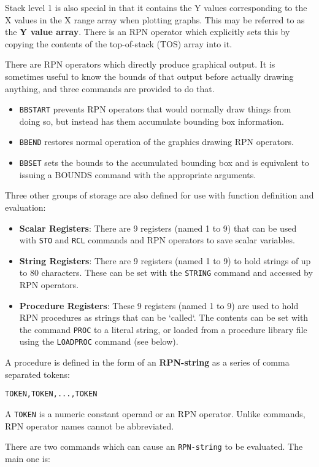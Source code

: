\documentclass[a4paper,twoside,11pt]{article}
\newcommand{\newpara}{\par\vspace{4mm}\noindent}
\newcommand{\textttc}[1]{\texttt{\textcolor{OurRed}{#1}}}
\begin{document}
\newpara
Stack level 1 is also special in that it contains the Y values corresponding to the X values in the X range array when plotting graphs.
This may be referred to as the \textbf{Y value array}. There is an RPN operator which explicitly sets this by copying the contents of
the top-of-stack (TOS) array into it.
\newpara
There are RPN operators which directly produce graphical output. It is sometimes useful to know the bounds of that output before
actually drawing anything, and three commands are provided to do that.
\begin{itemize}
\item \textttc{BBSTART} prevents RPN operators that would normally draw things from doing so, but instead has them accumulate bounding
	box information.
\item \textttc{BBEND} restores normal operation of the graphics drawing RPN operators.
\item \textttc{BBSET} sets the bounds to the accumulated bounding box and is equivalent to issuing a BOUNDS command with the
	appropriate arguments.
\end{itemize}
\newpara
Three other groups of storage are also defined for use with function definition and evaluation:
\begin{itemize}
\item \textbf{Scalar Registers}: There are 9 registers (named 1 to 9) that can be used with \texttt{STO} and \texttt{RCL} commands and RPN
	operators to save scalar variables.
\item \textbf{String Registers}: There are 9 registers (named 1 to 9) to hold strings of up to 80 characters. These can be set with the
	\texttt{STRING} command and accessed by RPN operators.
\item \textbf{Procedure Registers}: These 9 registers (named 1 to 9) are used to hold RPN procedures as strings that can be `called`. The
	contents can be set with the command \texttt{PROC} to a literal string, or loaded from a procedure library file using the
	\texttt{LOADPROC} command (see below).
\end{itemize}
\newpara
A procedure is defined in the form of an \textbf{RPN-string} as a series of comma separated tokens:
\begin{verbatim}
TOKEN,TOKEN,...,TOKEN
\end{verbatim}
A \texttt{TOKEN} is a numeric constant operand or an RPN operator. Unlike commands, RPN operator names cannot be abbreviated. 
\newpara
There are two commands which can cause an \texttt{RPN-string} to be evaluated. The main one is:
\end{document}
